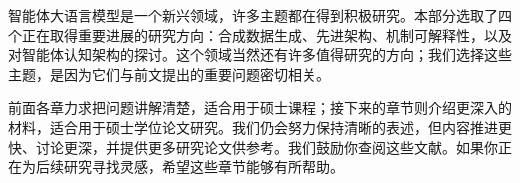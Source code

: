 智能体大语言模型是一个新兴领域，许多主题都在得到积极研究。本部分选取了四个正在取得重要进展的研究方向：合成数据生成、先进架构、机制可解释性，以及对智能体认知架构的探讨。这个领域当然还有许多值得研究的方向；我们选择这些主题，是因为它们与前文提出的重要问题密切相关。

前面各章力求把问题讲解清楚，适合用于硕士课程；接下来的章节则介绍更深入的材料，适合用于硕士学位论文研究。我们仍会努力保持清晰的表述，但内容推进更快、讨论更深，并提供更多研究论文供参考。我们鼓励你查阅这些文献。如果你正在为后续研究寻找灵感，希望这些章节能够有所帮助。

